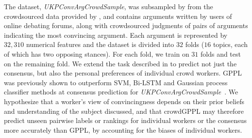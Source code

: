 The dataset, \emph{UKPConvArgCrowdSample}, was subsampled by \citet{simpson2018finding}
from the crowdsourced data provided by \citet{habernal2016argument}, and
contains arguments written by users
of online debating forums,
along with crowdsourced judgments of pairs of arguments
 indicating the most convincing argument.
Each argument is represented by $32,310$ numerical features and the
dataset is divided into $32$ folds ($16$ topics, each of which has two opposing stances). For each fold, we train on $31$ folds and test on the remaining fold.
We extend
the task described in \citet{simpson2018finding} to predict not just the consensus,
but also the personal preferences of individual crowd workers.
GPPL was previously shown to outperform SVM, Bi-LSTM and 
Gaussian process classifier methods at consensus prediction for \emph{UKPConvArgCrowdSample}~\citep{simpson2018finding}. 
We hypothesize that a worker's view of convincingness 
depends on their prior beliefs and understanding of the subject 
discussed, and that crowdGPPL may therefore
predict unseen 
pairwise labels or rankings for individual workers or the consensus more accurately than GPPL,
by accounting 
for the biases of individual workers.


